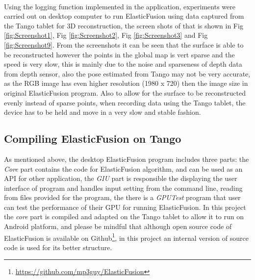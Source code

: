 \documentclass[12pt,twoside]{article}
\begin{document}
\\
Using the logging function implemented in the application, experiments were carried out on desktop computer to run
ElasticFusion using data captured from the Tango tablet for 3D reconstruction, the screen shots of that is shown in Fig \ref{fig:Screenshot1}, Fig \ref{fig:Screenshot2}, Fig \ref{fig:Screenshot3} and Fig \ref{fig:Screenshot9}. From the screenshots it can be seen that the surface is able to be reconstructed however the points in the global map is vert sparse and the speed is very slow, this is mainly due to the noise and sparseness of depth data from depth sensor, also the pose estimated from Tango may not be very accurate, as the RGB image has even higher resolution (1980 x 720) then the image size in original ElasticFusion program. Also to allow for the surface to be reconstructed evenly instead of sparse points, when recording data using the Tango tablet, the device has to be held and move in a very slow and stable fashion. \\

\newpage

\subsection{Compiling ElasticFusion on Tango}
As mentioned above, the desktop ElasticFusion program includes three parts: the \textit{Core} part contains the code for ElasticFusion algorithm, and can be used as an API for other application, the \textit{GIU} part is responsible the displaying the user interface of program and handles input setting from the command line, reading from files provided for the program, the there is a \textit{GPUTest} program that user can test the performance of their GPU for running ElasticFusion. In this project the \textit{core} part is compiled and adapted on the Tango tablet to allow it to run on Android platform, and please be mindful that although open source code of ElasticFusion is available on Github\footnote{\url{https://github.com/mp3guy/ElasticFusion}}, in this project an internal version of source code is used for its better structure.\\
\end{document}
